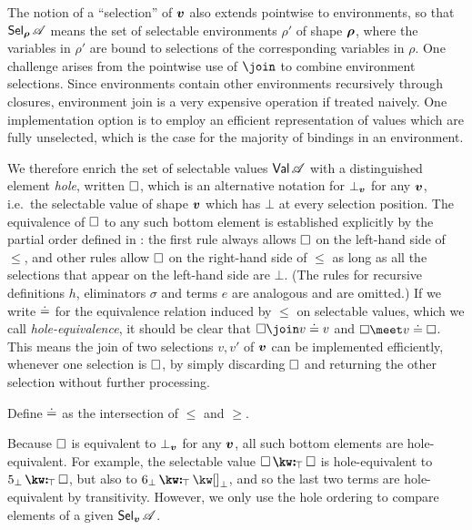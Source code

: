 The notion of a ``selection'' of $\bm{v}$ also extends pointwise to environments, so that $\textup{\textsf{Sel}}_{\bm{\rho}}\,{\mathscr{A}}$ means the set of selectable environments $\rho'$ of shape $\bm{\rho}$, where the variables in $\rho'$ are bound to selections of the corresponding variables in $\rho$. One challenge arises from the pointwise use of $\join$ to combine environment selections. Since environments contain other environments recursively through closures, environment join is a very expensive operation if treated naively. One implementation option is to employ an efficient representation of values which are fully unselected, which is the case for the majority of bindings in an environment.

We therefore enrich the set of selectable values $\textup{\textsf{Val}}\,{\mathscr{A}}$ with a distinguished element \emph{hole}, written $\square$, which is an alternative notation for $\bot_{\bm{v}}$ for any $\bm{v}$, i.e.~the selectable value of shape $\bm{v}$ which has $\bot$ at every selection position. The equivalence of $\square$ to any such bottom element is established explicitly by the partial order defined in : the first rule always allows $\square$ on the left-hand side of $\leq$, and other rules allow $\square$ on the right-hand side of $\leq$ as long as all the selections that appear on the left-hand side are $\bot$. (The rules for recursive definitions $h$, eliminators $\sigma$ and terms $e$ are analogous and are omitted.) If we write $\doteq$ for the equivalence relation induced by $\leq$ on selectable values, which we call \emph{hole-equivalence}, it should be clear that $\hole \join v \eq v$ and $\hole \meet v \eq \hole$. This means the join of two selections $v, v'$ of $\bm{v}$ can be implemented efficiently, whenever one selection is $\square$, by simply discarding $\square$ and returning the other selection without further processing.

\begin{definition}
   Define $\doteq$ as the intersection of $\leq$ and $\geq$.
\end{definition}

Because $\square$ is equivalent to $\bot_{\bm{v}}$ for any $\bm{v}$, all such bottom elements are hole-equivalent. For example, the selectable value $\annCons{\hole}{\hole}{\top}$ is hole-equivalent to $\annCons{5_{\bot}}{\hole}{\top}$, but also to $\annCons{6_{\bot}}{{\exNil_{\bot}}}{\top}$, and so the last two terms are hole-equivalent by transitivity. However, we only use the hole ordering to compare elements of a given $\textup{\textsf{Sel}}_{\bm{v}}\,{\mathscr{A}}$.
